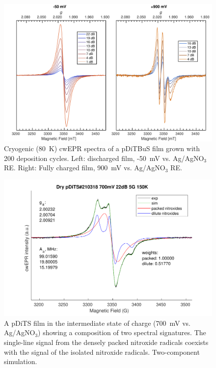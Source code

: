 \begin{figure}[!ht]
\center
	\includegraphics[width=1\textwidth]{./operando_epr/figures/CRYO/S220104_CW.pdf}
	\caption{Cryogenic (80~K) cwEPR spectra of a pDiTBuS film grown with 200 deposition cycles. Left: discharged film, -50~mV vs. Ag/AgNO$_3$ RE. Right: Fully charged film, 900~mV vs. Ag/AgNO$_3$ RE.}
	\label{fig:cwEPR_CRYO_DiTBuS_DCG_vs_CHG}
\end{figure}

\begin{figure}[h]
\center
	\includegraphics[width=1\textwidth]{./operando_epr/figures/CRYO/cw_sim_pDiTS_210318_700mV_2comp.pdf}
	\caption{A pDiTS film in the intermediate state of charge (700~mV vs. Ag/AgNO$_3$) showing a composition of two spectral signatures. The single-line signal from the densely packed nitroxide radicals coexists with the signal of the isolated nitroxide radicals. Two-component simulation.}
	\label{fig:cwEPR_CRYO_DiTS_2_COMP_SIM}
\end{figure}


